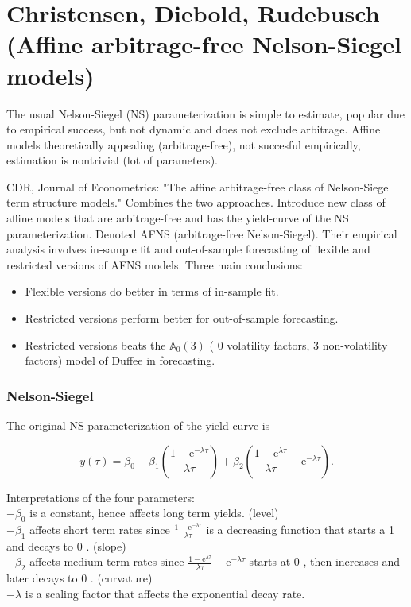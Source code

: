 \chapter{Christensen, Diebold, Rudebusch (Affine arbitrage-free Nelson-Siegel models)}
The usual Nelson-Siegel (NS) parameterization is simple to estimate, popular due to empirical success, but not dynamic and does not exclude arbitrage. Affine models theoretically appealing (arbitrage-free), not succesful empirically, estimation is nontrivial (lot of parameters).

CDR, Journal of Econometrics: "The affine arbitrage-free class of Nelson-Siegel term structure models." Combines the two approaches. Introduce new class of affine models that are arbitrage-free and has the yield-curve of the NS parameterization. Denoted AFNS (arbitrage-free Nelson-Siegel). Their empirical analysis involves in-sample fit and out-of-sample forecasting of flexible and restricted versions of AFNS models. Three main conclusions:

\begin{itemize}
  \item Flexible versions do better in terms of in-sample fit.
  \item Restricted versions perform better for out-of-sample forecasting.
  \item Restricted versions beats the $\mathbb{A}_{0}(3)$ ( 0 volatility factors, 3 non-volatility factors) model of Duffee in forecasting.
\end{itemize}

\subsection{Nelson-Siegel}
The original NS parameterization of the yield curve is

$$
y(\tau)=\beta_{0}+\beta_{1}\left(\frac{1-\mathrm{e}^{-\lambda \tau}}{\lambda \tau}\right)+\beta_{2}\left(\frac{1-\mathrm{e}^{\lambda \tau}}{\lambda \tau}-\mathrm{e}^{-\lambda \tau}\right) .
$$

Interpretations of the four parameters:\\
$-\beta_{0}$ is a constant, hence affects long term yields. (level)\\
$-\beta_{1}$ affects short term rates since $\frac{1-\mathrm{e}^{-\lambda \tau}}{\lambda \tau}$ is a decreasing function that starts a 1 and decays to 0 . (slope)\\
$-\beta_{2}$ affects medium term rates since $\frac{1-\mathrm{e}^{\lambda \tau}}{\lambda \tau}-\mathrm{e}^{-\lambda \tau}$ starts at 0 , then increases and later decays to 0 . (curvature)\\
$-\lambda$ is a scaling factor that affects the exponential decay rate.

